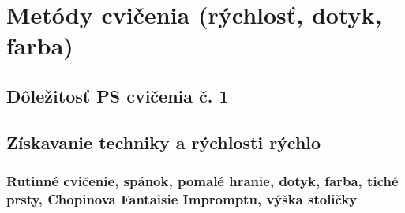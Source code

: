 \documentclass[11pt,a4paper%
]{article}
\begin{document}
%
%
%

\section{Metódy cvičenia  (rýchlosť, dotyk, farba)}

\subsection{Dôležitosť PS cvičenia č. 1}

\subsection{Získavanie techniky a rýchlosti ​​rýchlo}

\subsubsection{Rutinné cvičenie, spánok, pomalé hranie, dotyk, farba, tiché prsty, Chopinova Fantaisie Impromptu, výška stoličky}
\end{document}
